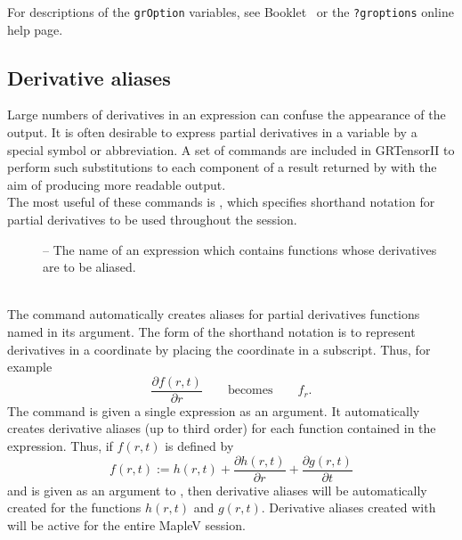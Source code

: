 \documentclass{article}
\begin{document}
For descriptions of the \texttt{grOption} variables, see Booklet 
\grSetupRef~or the \texttt{?groptions} online help page.
%
\subsection{Derivative aliases} \label{sec:alias}
%
Large numbers of derivatives in an expression can confuse the appearance
of the output. It is often desirable to express partial derivatives in
a variable by a special symbol or abbreviation. A set of commands are
included in GRTensorII to perform such substitutions to each component of a
result returned by  with the aim of producing more readable
output.\\

The most useful of these commands is , which specifies
shorthand notation for partial derivatives to be used throughout the
session.\\
%
\begin{cmdspec}
  \label{spec:autoAlias}

  \begin{description}
    \item[] -- The name of an expression which contains
      functions whose derivatives are to be aliased.
  \end{description}

\end{cmdspec}\\

The  command automatically creates aliases for partial
derivatives functions named in its argument. The form of the shorthand
notation is to represent derivatives in a coordinate by placing the
coordinate in a subscript. Thus, for example
\[
  \frac{\partial f(r,t)}{\partial r} \qquad \text{becomes} \qquad f_r.
\]
The  command is given a single
expression as an argument. It automatically creates derivative aliases 
(up to third order) for each function contained in the expression. Thus,
if $f(r,t)$ is defined by
\[
  f(r,t) := h(r,t) + \frac{\partial h(r,t)}{\partial r} +
    \frac{\partial g(r,t)}{\partial t}
\]
and is given as an argument to , then derivative aliases
will be automatically created for the functions $h(r,t)$ and $g(r,t)$.
Derivative aliases created with  will be active for the
entire MapleV session.
\end{document}

